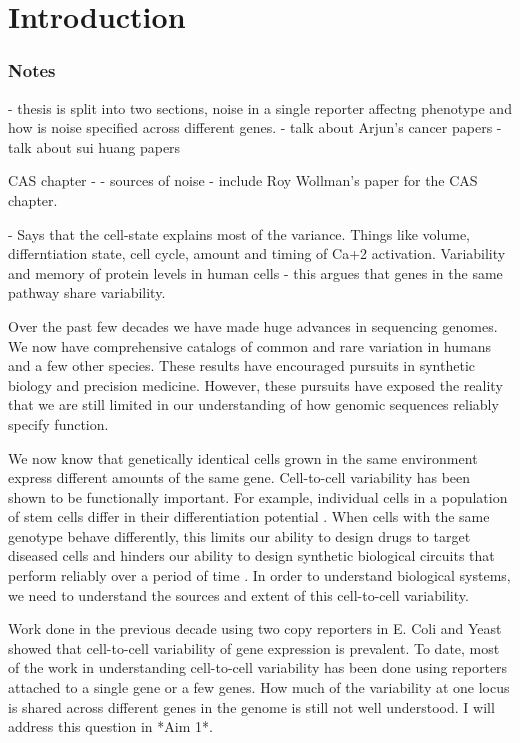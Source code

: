 \chapter{Introduction}
\label{chap:introduction}
\tightlists


\subsection{Notes}
- thesis is split into two sections, noise in a single reporter affectng phenotype and how is noise specified across different genes.
 - talk about Arjun's cancer papers
 - talk about sui huang papers


CAS chapter - - sources of noise
- include Roy Wollman's paper for the CAS chapter. 

    - Says that the cell-state explains most of the variance. Things like volume, differntiation state, cell cycle, amount and timing of Ca+2 activation.
Variability and memory of protein levels in human cells - this argues that genes in the same pathway share variability.


    



Over the past few decades we have made huge advances in sequencing genomes. We now have  comprehensive catalogs of common and rare variation in humans and a few other species. These results have encouraged pursuits in synthetic biology and precision medicine. However, these pursuits have exposed the reality that we are still limited in our understanding of how genomic sequences reliably specify function. 

We now know that genetically identical cells grown in the same environment express different amounts of the same gene. Cell-to-cell variability has been shown to be functionally important. For example, individual cells in a population of stem cells differ in their differentiation potential \cite{chang_transcriptome-wide_2008}. When cells with the same genotype behave differently, this limits our ability to design drugs to target diseased cells and hinders our ability to design synthetic biological circuits that perform reliably over a period of time \cite{elowitz_synthetic_2000}. In order to understand biological systems, we need to understand the sources and extent of this cell-to-cell variability.

Work done in the previous decade using two copy reporters in E. Coli \cite{elowitz_stochastic_2002} and Yeast \cite{raser_control_2004} showed that cell-to-cell variability of gene expression is prevalent. To date, most of the work in understanding cell-to-cell variability has been done using reporters attached to a single gene or a few genes. How much of the variability at one locus is shared across different genes in the genome is still not well understood. I will address this question in *Aim 1*.



